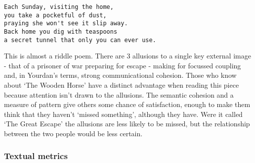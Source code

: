 \documentclass[11pt]{article}
\begin{document}
\begin{enumerate}
\begin{verbatim}
Each Sunday, visiting the home,
you take a pocketful of dust,
praying she won't see it slip away.
Back home you dig with teaspoons
a secret tunnel that only you can ever use.
\end{verbatim}
This is almost a riddle poem. There are 3 allusions to a single key external image - that of a prisoner of war preparing for escape - making for focussed coupling and, in Yourdan’s terms, strong communicational cohesion. Those who know about ‘The Wooden Horse’ have a distinct advantage when reading this piece because attention isn’t drawn to the allusions. The semantic cohesion and a measure of pattern give others some chance of satisfaction, enough to make them think that they haven’t ‘missed something’, although they have. Were it called ‘The Great Escape’ the allusions are less likely to be missed, but the relationship between the two people would be less certain.
\end{enumerate}

\subsubsection*{Textual metrics}
\end{document}
